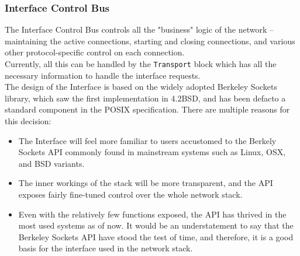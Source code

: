 \subsubsection{Interface Control Bus}\label{subsubsec:interface_control}
The Interface Control Bus controls all the "business" logic of the network --
maintaining the active connections, starting and closing connections, and various
other protocol-specific control on each connection.\\
Currently, all this can be handled by the \texttt{Transport} block which has all
the necessary information to handle the interface requests.\\
The design of the Interface is based on the widely adopted Berkeley Sockets library,
which saw the first implementation in 4.2BSD, and has been defacto a standard
component in the POSIX specification\cite{tcpip_illustrated_vol2}. There are
multiple reasons for this decision:
\begin{itemize}
\item The Interface will feel more familiar to users accustomed to the Berkely
Sockets API commonly found in mainstream systems such as Linux, OSX, and BSD
variants.

\item The inner workings of the stack will be more transparent, and the API
exposes fairly fine-tuned control over the whole network stack.

\item Even with the relatively few functions exposed, the API
has thrived in the most used systems as of now. It would be an understatement to
say that the Berkeley Sockets API have stood the test of time, and therefore, it
is a good basis for the interface used in the network stack.

\end{itemize}

